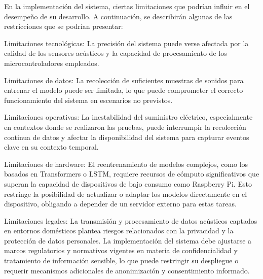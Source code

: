 
En la implementación del sistema, ciertas limitaciones que podrían influir en el desempeño de su desarrollo. A continuación, se describirán algunas de las restricciones que se podrían presentar:

Limitaciones tecnológicas: La precisión del sistema puede verse afectada por la calidad de los sensores acústicos y la capacidad de procesamiento de los microcontroladores empleados.

Limitaciones de datos: La recolección de suficientes muestras de sonidos para entrenar el modelo puede ser limitada, lo que puede comprometer el correcto funcionamiento del sistema en escenarios no previstos.

Limitaciones operativas: La inestabilidad del suministro eléctrico, especialmente en contextos donde se realizaron las pruebas, puede interrumpir la recolección continua de datos y afectar la disponibilidad del sistema para capturar eventos clave en su contexto temporal.

Limitaciones de hardware: El reentrenamiento de modelos complejos, como los basados en Transformers o LSTM, requiere recursos de cómputo significativos que superan la capacidad de dispositivos de bajo consumo como Raspberry Pi. Esto restringe la posibilidad de actualizar o adaptar los modelos directamente en el dispositivo, obligando a depender de un servidor externo para estas tareas.

Limitaciones legales: La transmisión y procesamiento de datos acústicos captados en entornos domésticos plantea riesgos relacionados con la privacidad y la protección de datos personales. La implementación del sistema debe ajustarse a marcos regulatorios y normativos vigentes en materia de confidencialidad y tratamiento de información sensible, lo que puede restringir su despliegue o requerir mecanismos adicionales de anonimización y consentimiento informado.
